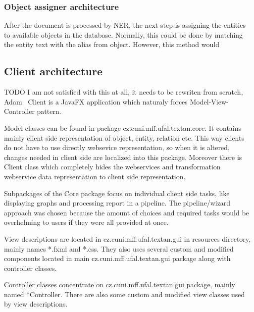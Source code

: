 \subsubsection{Object assigner architecture} %


After the document is processed by NER, the next step is assigning the entities to available objects in the database. 
Normally, this could be done by matching the entity text with the alias from object. However, this method would 


\subsection{Client architecture}

TODO I am not satisfied with this at all, it needs to be rewriten from scratch, Adam
\textan\ Client is a JavaFX application which naturaly forces Model-View-Controller
pattern.

Model classes can be found in package cz.cuni.mff.ufal.textan.core. It contains
mainly client side representation of object, entity, relation etc. This way
clients do not have to use directly websevice representation, so when it is
altered, changes needed in client side are localized into this package. Moreover
there is Client class which completely hides the webservices and transformation
webservice data representation to client side representation.

Subpackages of the Core package focus on individual client side tasks, like
displaying graphs and processing report in a pipeline. The pipeline/wizard
approach was chosen because the amount of choices and required tasks would
be overhelming to users if they were all provided at once.

View descriptions are located in cz.cuni.mff.ufal.textan.gui in resources
directory, mainly names *.fxml and *.css. They also uses several custom and
modified components located in main cz.cuni.mff.ufal.textan.gui package along
with controller classes.

Controller classes concentrate on cz.cuni.mff.ufal.textan.gui package,
mainly named *Controller. There are also some custom and modified view classes
used by view descriptions.
